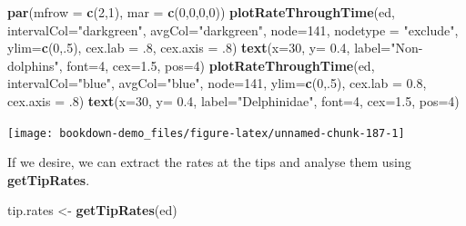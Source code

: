 \documentclass[
]{book}
\newenvironment{Shaded}{\begin{snugshade}}{\end{snugshade}}
\newcommand{\DataTypeTok}[1]{\textcolor[rgb]{0.13,0.29,0.53}{#1}}
\newcommand{\DecValTok}[1]{\textcolor[rgb]{0.00,0.00,0.81}{#1}}
\newcommand{\FloatTok}[1]{\textcolor[rgb]{0.00,0.00,0.81}{#1}}
\newcommand{\KeywordTok}[1]{\textcolor[rgb]{0.13,0.29,0.53}{\textbf{#1}}}
\newcommand{\NormalTok}[1]{#1}
\newcommand{\StringTok}[1]{\textcolor[rgb]{0.31,0.60,0.02}{#1}}
\begin{document}
\begin{Shaded}
\begin{Highlighting}[]
\KeywordTok{par}\NormalTok{(}\DataTypeTok{mfrow =} \KeywordTok{c}\NormalTok{(}\DecValTok{2}\NormalTok{,}\DecValTok{1}\NormalTok{), }\DataTypeTok{mar =} \KeywordTok{c}\NormalTok{(}\DecValTok{0}\NormalTok{,}\DecValTok{0}\NormalTok{,}\DecValTok{0}\NormalTok{,}\DecValTok{0}\NormalTok{))}
\KeywordTok{plotRateThroughTime}\NormalTok{(ed, }\DataTypeTok{intervalCol=}\StringTok{"darkgreen"}\NormalTok{, }\DataTypeTok{avgCol=}\StringTok{"darkgreen"}\NormalTok{, }\DataTypeTok{node=}\DecValTok{141}\NormalTok{, }\DataTypeTok{nodetype =} \StringTok{"exclude"}\NormalTok{, }\DataTypeTok{ylim=}\KeywordTok{c}\NormalTok{(}\DecValTok{0}\NormalTok{,.}\DecValTok{5}\NormalTok{), }\DataTypeTok{cex.lab =} \FloatTok{.8}\NormalTok{, }\DataTypeTok{cex.axis =} \FloatTok{.8}\NormalTok{)}
\KeywordTok{text}\NormalTok{(}\DataTypeTok{x=}\DecValTok{30}\NormalTok{, }\DataTypeTok{y=} \FloatTok{0.4}\NormalTok{, }\DataTypeTok{label=}\StringTok{"Non{-}dolphins"}\NormalTok{, }\DataTypeTok{font=}\DecValTok{4}\NormalTok{, }\DataTypeTok{cex=}\FloatTok{1.5}\NormalTok{, }\DataTypeTok{pos=}\DecValTok{4}\NormalTok{)}
\KeywordTok{plotRateThroughTime}\NormalTok{(ed, }\DataTypeTok{intervalCol=}\StringTok{"blue"}\NormalTok{, }\DataTypeTok{avgCol=}\StringTok{"blue"}\NormalTok{, }\DataTypeTok{node=}\DecValTok{141}\NormalTok{, }\DataTypeTok{ylim=}\KeywordTok{c}\NormalTok{(}\DecValTok{0}\NormalTok{,.}\DecValTok{5}\NormalTok{), }\DataTypeTok{cex.lab =} \FloatTok{0.8}\NormalTok{, }\DataTypeTok{cex.axis =} \FloatTok{.8}\NormalTok{)}
\KeywordTok{text}\NormalTok{(}\DataTypeTok{x=}\DecValTok{30}\NormalTok{, }\DataTypeTok{y=} \FloatTok{0.4}\NormalTok{, }\DataTypeTok{label=}\StringTok{"Delphinidae"}\NormalTok{, }\DataTypeTok{font=}\DecValTok{4}\NormalTok{, }\DataTypeTok{cex=}\FloatTok{1.5}\NormalTok{, }\DataTypeTok{pos=}\DecValTok{4}\NormalTok{)}
\end{Highlighting}
\end{Shaded}

\begin{center}\texttt{[image: bookdown-demo\_files/figure-latex/unnamed-chunk-187-1]} \end{center}

If we desire, we can extract the rates at the tips and analyse them using \textbf{getTipRates}.

\begin{Shaded}
\begin{Highlighting}[]
\NormalTok{tip.rates \textless{}{-}}\StringTok{ }\KeywordTok{getTipRates}\NormalTok{(ed)}
\end{Highlighting}
\end{Shaded}
\end{document}
